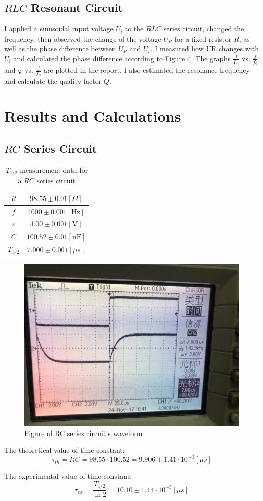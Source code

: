 \documentclass[12pt]{article}
\begin{document}
\subsection{$RLC$ Resonant Circuit}
I applied a sinusoidal input voltage $U_i$ to the $RLC$ series circuit, changed the frequency,
then observed the change of the voltage $U_R$ for a fixed resistor $R$, as well as the phase
difference between $U_R$ and $U_i$. I measured how UR changes with $U_i$ and calculated the phase
difference according to Figure 4. The graphs $\frac{I}{I_m}$ vs. $\frac{f}{f_0}$ and $\varphi$ vs. $\frac{f}{f_0}$ are plotted in the report. I also estimated the resonance frequency and calculate the quality factor $Q$.
\section{Results and Calculations}
\subsection{$RC$ Series Circuit}
\begin{table}[H]
\centering
\begin{tabular}{|c|c|}
\hline
$R$&$98.55\pm0.01[\Omega]$\\ \hline
$f$&$4000\pm0.001[\mathrm{Hz}]$\\ \hline
$\varepsilon$&$4.00\pm0.001[\mathrm{V}]$\\ \hline
$C$&$100.52\pm0.01[\mathrm{nF}]$\\ \hline
$T_{1/2}$&$7.000\pm0.001[\mu s]$\\ \hline
\end{tabular}
\caption{$T_{1/2}$ measurement data for a $RC$ series circuit}
\end{table}
\begin{figure}[H]
\centering
\includegraphics[scale=0.2]{P6.jpg}
\caption{Figure of RC series circuit's waveform}
\end{figure}
The theoretical value of time constant:
$$\tau_{th}=RC=98.55\cdot100.52=9.906\pm1.41\cdot10^{-3}[\mu s]$$
\par The experimental value of time constant:
$$\tau_{ex}=\frac{T_{1/2}}{\ln2}=10.10\pm1.44\cdot10^{-3}[\mu s]$$
\end{document}
